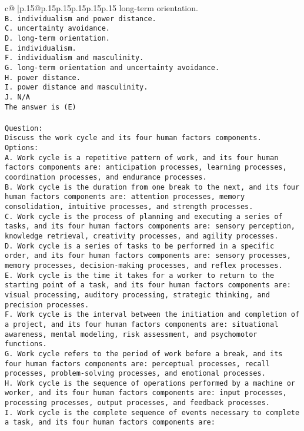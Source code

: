 \documentclass{article}
\begin{document}
{\begin{supertabular}{c@{$\;$}|p{.15\linewidth}@{}p{.15\linewidth}p{.15\linewidth}p{.15\linewidth}p{.15\linewidth}p{.15\linewidth}}
{{{long-term orientation.\\ \tt B. individualism and power distance.\\ \tt C. uncertainty avoidance.\\ \tt D. long-term orientation.\\ \tt E. individualism.\\ \tt F. individualism and masculinity.\\ \tt G. long-term orientation and uncertainty avoidance.\\ \tt H. power distance.\\ \tt I. power distance and masculinity.\\ \tt J. N/A\\ \tt The answer is (E)\\ \tt \\ \tt Question:\\ \tt Discuss the work cycle and its four human factors components.\\ \tt Options:\\ \tt A. Work cycle is a repetitive pattern of work, and its four human factors components are: anticipation processes, learning processes, coordination processes, and endurance processes.\\ \tt B. Work cycle is the duration from one break to the next, and its four human factors components are: attention processes, memory consolidation, intuitive processes, and strength processes.\\ \tt C. Work cycle is the process of planning and executing a series of tasks, and its four human factors components are: sensory perception, knowledge retrieval, creativity processes, and agility processes.\\ \tt D. Work cycle is a series of tasks to be performed in a specific order, and its four human factors components are: sensory processes, memory processes, decision-making processes, and reflex processes.\\ \tt E. Work cycle is the time it takes for a worker to return to the starting point of a task, and its four human factors components are: visual processing, auditory processing, strategic thinking, and precision processes.\\ \tt F. Work cycle is the interval between the initiation and completion of a project, and its four human factors components are: situational awareness, mental modeling, risk assessment, and psychomotor functions.\\ \tt G. Work cycle refers to the period of work before a break, and its four human factors components are: perceptual processes, recall processes, problem-solving processes, and emotional processes.\\ \tt H. Work cycle is the sequence of operations performed by a machine or worker, and its four human factors components are: input processes, processing processes, output processes, and feedback processes.\\ \tt I. Work cycle is the complete sequence of events necessary to complete a task, and its four human factors components are: }}}
\end{supertabular}}
\end{document}
